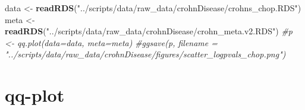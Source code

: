 \documentclass[]{article}
\newenvironment{Shaded}{\begin{snugshade}}{\end{snugshade}}
\newcommand{\KeywordTok}[1]{\textcolor[rgb]{0.13,0.29,0.53}{\textbf{#1}}}
\newcommand{\StringTok}[1]{\textcolor[rgb]{0.31,0.60,0.02}{#1}}
\newcommand{\CommentTok}[1]{\textcolor[rgb]{0.56,0.35,0.01}{\textit{#1}}}
\newcommand{\NormalTok}[1]{#1}
\begin{document}
\begin{Shaded}
\begin{Highlighting}[]
\NormalTok{data <-}\StringTok{ }\KeywordTok{readRDS}\NormalTok{(}\StringTok{"../scripts/data/raw_data/crohnDisease/crohns_chop.RDS"}\NormalTok{)}
\NormalTok{meta <-}\StringTok{ }\KeywordTok{readRDS}\NormalTok{(}\StringTok{"../scripts/data/raw_data/crohnDisease/crohn_meta.v2.RDS"}\NormalTok{)}
\CommentTok{#p <- qq.plot(data=data, meta=meta)}
\CommentTok{#ggsave(p, filename = "../scripts/data/raw_data/crohnDisease/figures/scatter_logpvals_chop.png")}
\end{Highlighting}
\end{Shaded}

\section{qq-plot}
\end{document}
